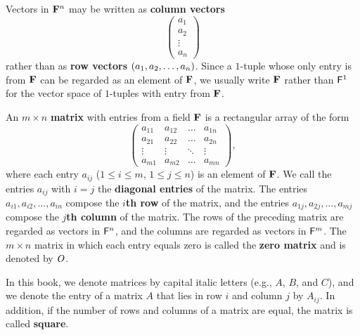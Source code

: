 \begin{defn}\label{1.2.5}
    Vectors in \(\mathbf{F}^n\) may be written as \textbf{column vectors}
    \[
        \begin{pmatrix}
            a_{1}  \\
            a_{2}  \\
            \vdots \\
            a_{n}
        \end{pmatrix}
    \]
    rather than as \textbf{row vectors} \({\left\lparen{a}_{1}, {a}_{2}, \dots, {a}_{n}\right\rparen}\).
    Since a \(1\)-tuple whose only entry is from \(\mathbf{F}\) can be regarded as an element of \(\mathbf{F}\), we usually write \(\mathbf{F}\) rather than \(\mathsf{F}^{1}\) for the vector space of \(1\)-tuples with entry from \(\mathbf{F}\).
\end{defn}

\begin{defn}\label{1.2.6}
    An \(m \times n\) \textbf{matrix} with entries from a field \(\mathbf{F}\) is a rectangular array of the form
    \[
        \begin{pmatrix}
            a_{1 1} & a_{1 2} & \dots  & a_{1 n} \\
            a_{2 1} & a_{2 2} & \dots  & a_{2 n} \\
            \vdots  & \vdots  & \ddots & \vdots  \\
            a_{m 1} & a_{m 2} & \dots  & a_{m n}
        \end{pmatrix},
    \]
    where each entry \(a_{i j}\) (\(1 \leq i \leq m\), \(1 \leq j \leq n\)) is an element of \(\mathbf{F}\).
    We call the entries \(a_{i j}\) with \(i = j\) the \textbf{diagonal entries} of the matrix.
    The entries \(a_{i 1} ,a_{i 2} , \dots, a_{i n}\) compose the \textbf{\(i\)th row} of the matrix, and the entries \(a_{1 j}, a_{2 j}, \dots, a_{m j}\) compose the \textbf{\(j\)th column} of the matrix.
    The rows of the preceding matrix are regarded as vectors in \(\mathsf{F}^{n}\), and the columns are regarded as vectors in \(\mathsf{F}^{m}\).
    The \(m \times n\) matrix in which each entry equals zero is called the \textbf{zero matrix} and is denoted by \(\mathit{O}\).
\end{defn}

\begin{defn}\label{1.2.7}
    In this book, we denote matrices by capital italic letters (e.g., \(A\), \(B\), and \(C\)), and we denote the entry of a matrix \(A\) that lies in row \(i\) and column \(j\) by \(A_{i j}\).
    In addition, if the number of rows and columns of a matrix are equal, the matrix is called \textbf{square}.
\end{defn}

